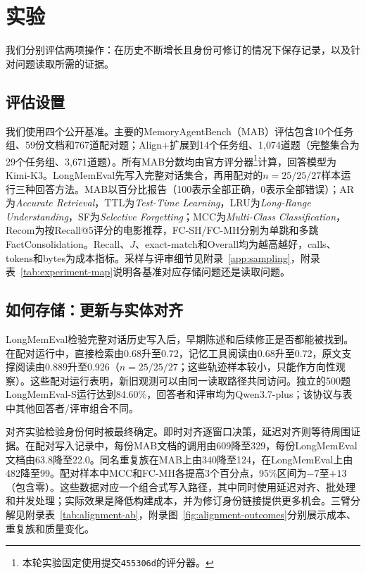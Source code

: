 \section{实验}
\label{sec:experiments}

我们分别评估两项操作：在历史不断增长且身份可修订的情况下保存记录，以及针对问题读取所需的证据。

\subsection{评估设置}
\label{sec:setup}

我们使用四个公开基准。主要的MemoryAgentBench（MAB）评估包含10个任务组、59份文档和767道配对题；Align+扩展到14个任务组、1{,}074道题（完整集合为29个任务组、3{,}671道题）。所有MAB分数均由官方评分器\footnote{本轮实验固定使用提交\texttt{455306d}的评分器。}计算，回答模型为Kimi-K3。LongMemEval先写入完整对话集合，再用配对的$n{=}25/25/27$样本运行三种回答方法。MAB以百分比报告（100表示全部正确，0表示全部错误）；AR为\emph{Accurate Retrieval}，TTL为\emph{Test-Time Learning}，LRU为\emph{Long-Range Understanding}，SF为\emph{Selective Forgetting}；MCC为\emph{Multi-Class Classification}，Recom为按Recall@5评分的电影推荐，FC-SH/FC-MH分别为单跳和多跳FactConsolidation。Recall、$J$、exact-match和Overall均为越高越好，calls、tokens和bytes为成本指标。采样与评审细节见附录~\ref{app:sampling}，附录表~\ref{tab:experiment-map}说明各基准对应存储问题还是读取问题。



\subsection{如何存储：更新与实体对齐}
\label{sec:temporal-benchmark}
\label{sec:engine-versions}
\label{sec:engine-paired}
\label{sec:deletion-boundary}

LongMemEval检验完整对话历史写入后，早期陈述和后续修正是否都能被找到。在配对运行中，直接检索由0.68升至0.72，记忆工具阅读由0.68升至0.72，原文支撑阅读由0.889升至0.926（$n{=}25/25/27$；这些轨迹样本较小，只能作方向性观察）。这些配对运行表明，新旧观测可以由同一读取路径共同访问。独立的500题LongMemEval-S运行达到84.60\%，回答者和评审均为Qwen3.7-plus；该协议与表中其他回答者/评审组合不同。

对齐实验检验身份何时被最终确定。即时对齐逐窗口决策，延迟对齐则等待周围证据。在配对写入记录中，每份MAB文档的调用由609降至329，每份LongMemEval文档由63.8降至22.0。同名重复族在MAB上由340降至124，在LongMemEval上由482降至99。配对样本中MCC和FC-MH各提高3个百分点，95\%区间为$-7$至$+13$（包含零）。这些数据对应一个组合式写入路径，其中同时使用延迟对齐、批处理和并发处理；实际效果是降低构建成本，并为修订身份链接提供更多机会。三臂分解见附录表~\ref{tab:alignment-ab}，附录图~\ref{fig:alignment-outcomes}分别展示成本、重复族和质量变化。

